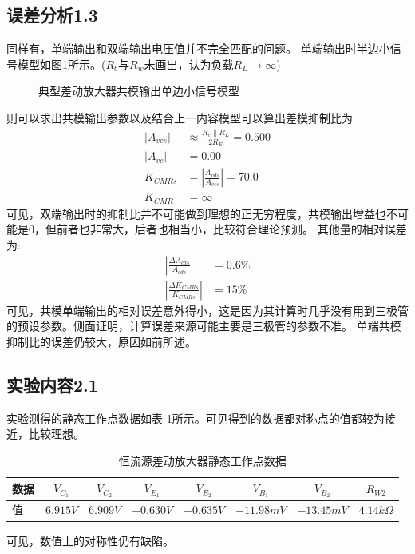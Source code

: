 \documentclass[a4paper,11pt,UTF8]{ctexart}
\begin{document}
\subsection{误差分析1.3}
同样有，单端输出和双端输出电压值并不完全匹配的问题。
单端输出时半边小信号模型如图\ref{fig:ncSmallSignal}所示。($R_b$与$R_w$未画出，认为负载$R_L\rightarrow\infty$)
\begin{figure}[htbp]
  \centering
  \caption{典型差动放大器共模输出单边小信号模型}
  \label{fig:ncSmallSignal}
  \end{figure}
则可以求出共模输出参数以及结合上一内容模型可以算出差模抑制比为
\begin{equation}
  \begin{aligned}
    \left | A_{vcs}\right |&\approx\frac{R_c\parallel R_L}{2R_E}=0.500\\
    \left | A_{vc}\right |&=0.00\\
    K_{CMRs}&=\left |\frac{A_{vds}}{A_{vcs}}\right |=70.0\\
    K_{CMR}&=\infty
  \end{aligned}
\end{equation}
可见，双端输出时的抑制比并不可能做到理想的正无穷程度，共模输出增益也不可能是0，但前者也非常大，后者也相当小，比较符合理论预测。
其他量的相对误差为:
\begin{equation}
  \begin{aligned}
      \left |\frac{\Delta A_{cds}}{A_{cds}}\right |&=0.6\%\\
      \left |\frac{\Delta K_{CMRs}}{K_{CMRs}}\right |&=15\%
  \end{aligned}
\end{equation}
可见，共模单端输出的相对误差意外得小，这是因为其计算时几乎没有用到三极管的预设参数。侧面证明，计算误差来源可能主要是三极管的参数不准。
单端共模抑制比的误差仍较大，原因如前所述。

\subsection{实验内容2.1}
实验测得的静态工作点数据如表 \ref{tab:sSTab}所示。可见得到的数据都对称点的值都较为接近，比较理想。
  \begin{table}[!h!tbp]
    \caption{恒流源差动放大器静态工作点数据}\label{tab:sSTab}
      \centering
      \begin{tabular}{|l|c|c|c|c|c|c|c|}
      \hline
      数据 &$V_{C_1}$&$V_{C_2}$&$V_{E_1}$&$V_{E_2}$&$V_{B_1}$&$V_{B_2}$&$R_{W2}$         \\ \hline
      值   &$6.915V$&$6.909V$&$-0.630V$&$-0.635V$&$-11.98mV$&$-13.45mV$&$4.14k\Omega$     \\ \hline
    \end{tabular}
    \end{table}
可见，数值上的对称性仍有缺陷。
\end{document}
